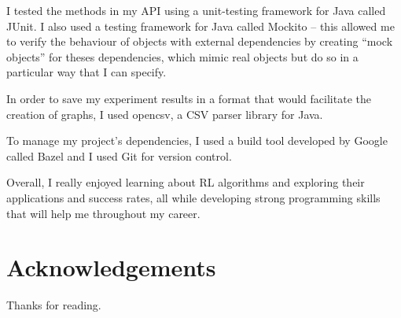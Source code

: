 \documentclass[11pt,a4paper]{report}
\begin{document}
I tested the methods in my API using a unit-testing framework for Java called JUnit. I also used a testing framework for Java called Mockito – this allowed me to verify the behaviour of objects with external dependencies by creating “mock objects” for theses dependencies, which mimic real objects but do so in a particular way that I can specify.

In order to save my experiment results in a format that would facilitate the creation of graphs, I used opencsv, a CSV parser library for Java.

To manage my project’s dependencies, I used a build tool developed by Google called Bazel and I used Git for version control.

Overall, I really enjoyed learning about RL algorithms and exploring their applications and success rates, all while developing strong programming skills that will help me throughout my career.


\chapter{Acknowledgements}

Thanks for reading.
\end{document}
